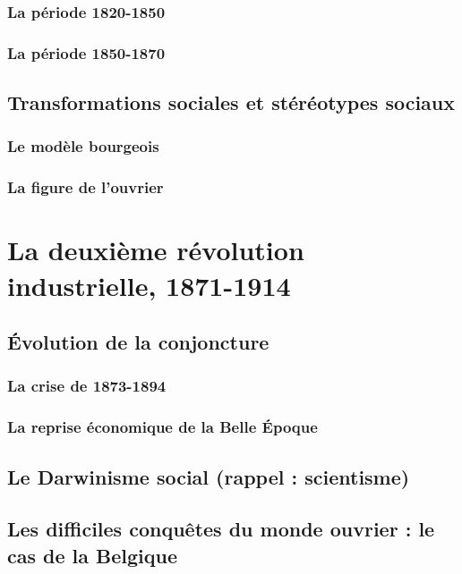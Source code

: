 \documentclass[12pt]{report}
\begin{document}
\subsubsection{La période 1820-1850}

\subsubsection{La période 1850-1870}

\subsection{Transformations sociales et stéréotypes sociaux}

\subsubsection{Le modèle bourgeois}

\subsubsection{La figure de l'ouvrier}

\section{La deuxième révolution industrielle, 1871-1914}

\subsection{Évolution de la conjoncture}

\subsubsection{La crise de 1873-1894}

\subsubsection{La reprise économique de la Belle Époque}

\subsection{Le Darwinisme social (rappel : scientisme)}

\subsection{Les difficiles conquêtes du monde ouvrier : le cas de la Belgique}
\end{document}
